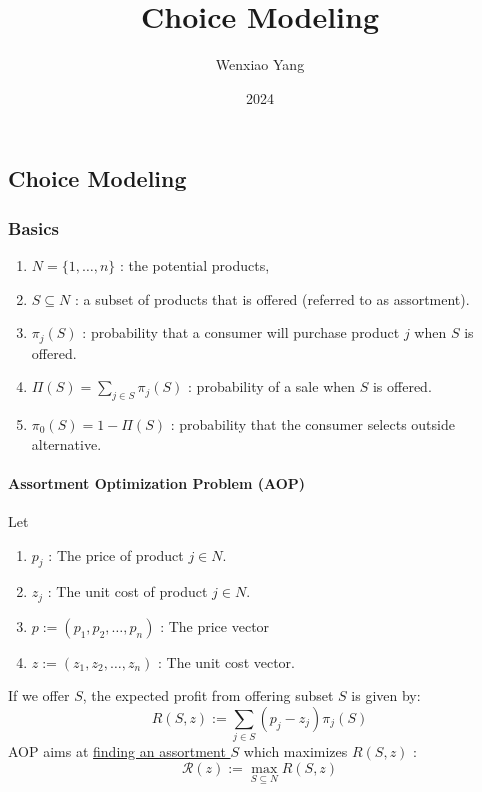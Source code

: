 \documentclass[11pt]{elegantbook}
\title{Choice Modeling}
\author{Wenxiao Yang}
\institute{Haas School of Business, University of California Berkeley}
\date{2024}
\begin{document}
\maketitle

\frontmatter
\tableofcontents

\mainmatter






\chapter{}

\section{Choice Modeling}
\begin{center}
\end{center}
\subsection{Basics}
\begin{enumerate}[$\bullet$]
    \item $N=\{1, \ldots, n\}$ : the potential products,
    \item $S \subseteq N$ : a subset of products that is offered (referred to as assortment).
    \item $\pi_{j}(S)$ : probability that a consumer will purchase product $j$ when $S$ is offered.
    \item $\Pi(S)=\sum_{j \in S} \pi_{j}(S)$ : probability of a sale when $S$ is offered.
    \item $\pi_{0}(S)=1-\Pi(S)$ : probability that the consumer selects outside alternative.
\end{enumerate}
\subsubsection{Assortment Optimization Problem (AOP)}
Let
\begin{enumerate}[$\bullet$]
    \item $p_{j}$ : The price of product $j \in N$.
    \item $z_{j}$ : The unit cost of product $j \in N$.
    \item $p:=\left(p_{1}, p_{2}, \ldots, p_{n}\right)$ : The price vector
    \item $z:=\left(z_{1}, z_{2}, \ldots, z_{n}\right)$ : The unit cost vector.
\end{enumerate}
If we offer $S$, the expected profit from offering subset $S$ is given by:
$$
R(S, z):=\sum_{j \in S}\left(p_{j}-z_{j}\right) \pi_{j}(S)
$$
AOP aims at \underline{finding an assortment $S$} which maximizes $R(S, z)$ :
$$
\mathcal{R}(z):=\max _{S \subseteq N} R(S, z)
$$
\end{document}
